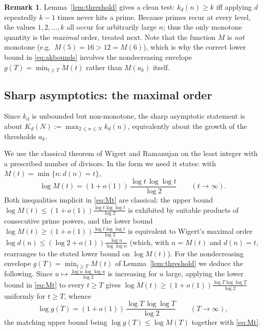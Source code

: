\documentclass{amsart}
\theoremstyle{definition}
\newtheorem{remark}{Remark}
\begin{document}
\begin{remark}
Lemma~\ref{lem:threshold} gives a clean test: $k_d(n)\ge k$ iff applying $d$
repeatedly $k-1$ times never hits a prime. Because primes recur at every level,
the values $1,2,\dots,k$ all occur for arbitrarily large $n$; thus the only
monotone quantity is the \emph{maximal} order, treated next. Note that the
function $M$ is \emph{not} monotone (e.g.\ $M(5)=16>12=M(6)$), which is why the
correct lower bound in \eqref{eq:akbounds} involves the nondecreasing envelope
$g(T)=\min_{t\ge T}M(t)$ rather than $M(a_k)$ itself.
\end{remark}

\subsection{Sharp asymptotics: the maximal order}

Since $k_d$ is unbounded but non-monotone, the sharp asymptotic statement is
about $K_d(N):=\max_{2\le n\le N}k_d(n)$, equivalently about the growth of the
thresholds $a_k$.

We use the classical theorem of Wigert and Ramanujan on the least integer with
a prescribed number of divisors. In the form we need it states: with
$M(t)=\min\{n:d(n)=t\}$,
\begin{equation}\label{eq:Mt}
\log M(t)=(1+o(1))\,\frac{\log t\,\log\log t}{\log 2}\qquad(t\to\infty).
\end{equation}
Both inequalities implicit in \eqref{eq:Mt} are classical: the upper bound
$\log M(t)\le(1+o(1))\frac{\log t\log\log t}{\log2}$ is exhibited by suitable
products of consecutive prime powers, and the lower bound
$\log M(t)\ge(1+o(1))\frac{\log t\log\log t}{\log2}$ is equivalent to Wigert's
maximal order $\log d(n)\le(\log2+o(1))\frac{\log n}{\log\log n}$ (which, with
$n=M(t)$ and $d(n)=t$, rearranges to the stated lower bound on $\log M(t)$).
For the nondecreasing envelope $g(T)=\min_{t\ge T}M(t)$ of
Lemma~\ref{lem:threshold} we deduce the following. Since
$u\mapsto\frac{\log u\,\log\log u}{\log2}$ is increasing for $u$ large, applying
the lower bound in \eqref{eq:Mt} to every $t\ge T$ gives
$\log M(t)\ge(1+o(1))\frac{\log T\log\log T}{\log2}$ uniformly for $t\ge T$,
whence
\begin{equation}\label{eq:gTeq}
\log g(T)=(1+o(1))\,\frac{\log T\,\log\log T}{\log 2}\qquad(T\to\infty),
\end{equation}
the matching upper bound being $\log g(T)\le\log M(T)$ together with
\eqref{eq:Mt}.
\end{document}
